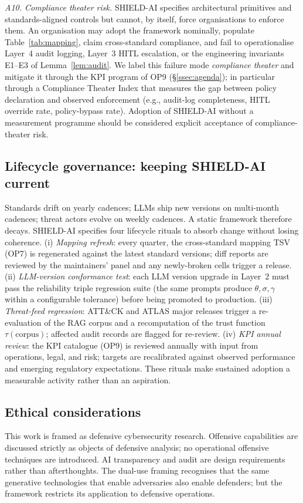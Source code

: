 \documentclass[preprint,12pt,authoryear]{elsarticle}
\begin{document}
\emph{A10. Compliance theater risk.} SHIELD-AI specifies architectural primitives and standards-aligned controls but cannot, by itself, force organisations to enforce them. An organisation may adopt the framework nominally, populate Table~\ref{tab:mapping}, claim cross-standard compliance, and fail to operationalise Layer~4 audit logging, Layer~3 HITL escalation, or the engineering invariants E1--E3 of Lemma~\ref{lem:audit}. We label this failure mode \emph{compliance theater} and mitigate it through the KPI program of OP9 (§\ref{ssec:agenda}); in particular through a Compliance Theater Index that measures the gap between policy declaration and observed enforcement (e.g., audit-log completeness, HITL override rate, policy-bypass rate). Adoption of SHIELD-AI without a measurement programme should be considered explicit acceptance of compliance-theater risk.

\subsection{Lifecycle governance: keeping SHIELD-AI current}
\label{ssec:lifecycle}
Standards drift on yearly cadences; LLMs ship new versions on multi-month cadences; threat actors evolve on weekly cadences. A static framework therefore decays. SHIELD-AI specifies four lifecycle rituals to absorb change without losing coherence. (i) \emph{Mapping refresh}: every quarter, the cross-standard mapping TSV (OP7) is regenerated against the latest standard versions; diff reports are reviewed by the maintainers' panel and any newly-broken cells trigger a release. (ii) \emph{LLM-version conformance test}: each LLM version upgrade in Layer~2 must pass the reliability triple regression suite (the same prompts produce $\theta, \sigma, \gamma$ within a configurable tolerance) before being promoted to production. (iii) \emph{Threat-feed regression}: ATT\&CK and ATLAS major releases trigger a re-evaluation of the RAG corpus and a recomputation of the trust function $\tau(\text{corpus})$; affected audit records are flagged for re-review. (iv) \emph{KPI annual review}: the KPI catalogue (OP9) is reviewed annually with input from operations, legal, and risk; targets are recalibrated against observed performance and emerging regulatory expectations. These rituals make sustained adoption a measurable activity rather than an aspiration.

\subsection{Ethical considerations}
This work is framed as defensive cybersecurity research. Offensive capabilities are discussed strictly as objects of defensive analysis; no operational offensive techniques are introduced. AI transparency and audit are design requirements rather than afterthoughts. The dual-use framing recognises that the same generative technologies that enable adversaries also enable defenders; but the framework restricts its application to defensive operations.
\end{document}
